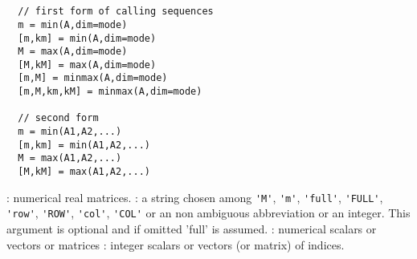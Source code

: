 \begin{mandesc}
  \\ 
  \\ 
\end{mandesc}
\begin{calling_sequence}
\begin{verbatim}
  // first form of calling sequences
  m = min(A,dim=mode)
  [m,km] = min(A,dim=mode)
  M = max(A,dim=mode)
  [M,kM] = max(A,dim=mode)
  [m,M] = minmax(A,dim=mode)
  [m,M,km,kM] = minmax(A,dim=mode)

  // second form
  m = min(A1,A2,...)  
  [m,km] = min(A1,A2,...) 
  M = max(A1,A2,...)  
  [M,kM] = max(A1,A2,...)  
\end{verbatim}
\end{calling_sequence}
\begin{parameters}
  \begin{varlist}
    : numerical real matrices.
    : a string chosen among \verb+'M'+, \verb+'m'+, \verb+'full'+, \verb+'FULL'+, \verb+'row'+,
    \verb+'ROW'+, \verb+'col'+, \verb+'COL'+ or an non ambiguous abbreviation or an integer. 
    This argument is optional and if omitted 'full' is assumed.
    : numerical scalars or vectors or matrices
    : integer scalars or vectors (or matrix) of indices.
  \end{varlist}
\end{parameters}

